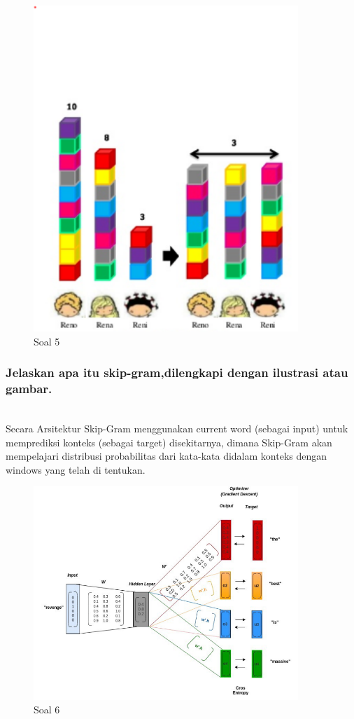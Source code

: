 	\begin{figure}[H]
		\begin{center}
		 \includegraphics[width=10cm]{figures/1174076/figures5/teori5.png}
		 \caption{Soal 5}	
		\end{center}
	\end{figure}
	
	\subsubsection{Jelaskan apa itu skip-gram,dilengkapi dengan ilustrasi atau gambar.}
	\hfill\\
	Secara Arsitektur Skip-Gram menggunakan current word (sebagai input) untuk memprediksi konteks (sebagai target) disekitarnya, dimana Skip-Gram akan mempelajari distribusi probabilitas dari kata-kata didalam konteks dengan windows yang telah di tentukan.
	
	\begin{figure}[H]
		\begin{center}
		 \includegraphics[width=10cm]{figures/1174076/figures5/teori6.png}
		 \caption{Soal 6}	
		\end{center}
	\end{figure}
		
